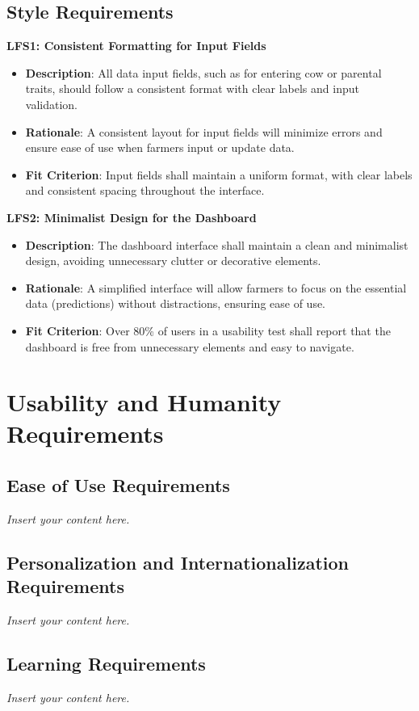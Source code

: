 \documentclass[12pt]{article}
\newcommand{\lips}{\textit{Insert your content here.}}
\begin{document}
\subsection{Style Requirements}
\textbf{LFS1: Consistent Formatting for Input Fields}
\begin{itemize}
    \item \textbf{Description}: All data input fields, such as for entering 
    cow or parental traits, should follow a consistent format with clear labels 
    and input validation.
    \item \textbf{Rationale}: A consistent layout for input fields will 
    minimize errors and ensure ease of use when farmers input or update data.
    \item \textbf{Fit Criterion}: Input fields shall maintain a uniform 
    format, with clear labels and consistent spacing throughout the interface.
\end{itemize}
\textbf{LFS2: Minimalist Design for the Dashboard}
\begin{itemize}
    \item \textbf{Description}: The dashboard interface shall maintain a 
    clean and minimalist design, avoiding unnecessary clutter or decorative 
    elements.
    \item \textbf{Rationale}: A simplified interface will allow farmers to 
    focus on the essential data (predictions) without distractions, ensuring 
    ease of use.
    \item \textbf{Fit Criterion}: Over 80\% of users in a usability test 
    shall report that the dashboard is free from unnecessary elements and 
    easy to navigate.
\end{itemize}


\section{Usability and Humanity Requirements}
\subsection{Ease of Use Requirements}
\lips
\subsection{Personalization and Internationalization Requirements}
\lips
\subsection{Learning Requirements}
\lips
\end{document}
